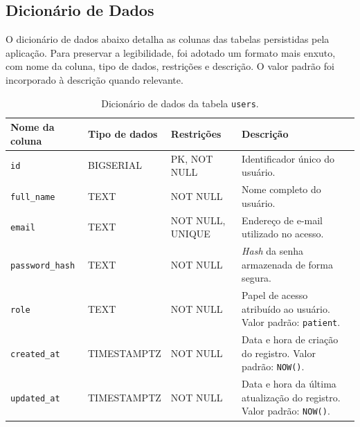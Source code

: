 \begin{apendicesenv}
\section{Dicionário de Dados}
\label{ap:impl-dicionario}

O dicionário de dados abaixo detalha as colunas das tabelas persistidas pela aplicação. Para
preservar a legibilidade, foi adotado um formato mais enxuto, com nome da coluna, tipo de dados,
restrições e descrição. O valor padrão foi incorporado à descrição quando relevante.

\begin{table}[htb]
\centering
\small
\caption{Dicionário de dados da tabela \texttt{users}.}
\label{tab:dd-users}
\begin{tabularx}{\textwidth}{p{3.2cm}p{2.8cm}p{3.1cm}X}
\hline
Nome da coluna & Tipo de dados & Restrições & Descrição \\
\hline
\texttt{id} & BIGSERIAL & PK, NOT NULL & Identificador único do usuário. \\
\texttt{full\_name} & TEXT & NOT NULL & Nome completo do usuário. \\
\texttt{email} & TEXT & NOT NULL, UNIQUE & Endereço de e-mail utilizado no acesso. \\
\texttt{password\_hash} & TEXT & NOT NULL & \textit{Hash} da senha armazenada de forma segura. \\
\texttt{role} & TEXT & NOT NULL & Papel de acesso atribuído ao usuário. Valor padrão: \texttt{patient}. \\
\texttt{created\_at} & TIMESTAMPTZ & NOT NULL & Data e hora de criação do registro. Valor padrão: \texttt{NOW()}. \\
\texttt{updated\_at} & TIMESTAMPTZ & NOT NULL & Data e hora da última atualização do registro. Valor padrão: \texttt{NOW()}. \\
\hline
\end{tabularx}
\end{table}


\end{apendicesenv}
